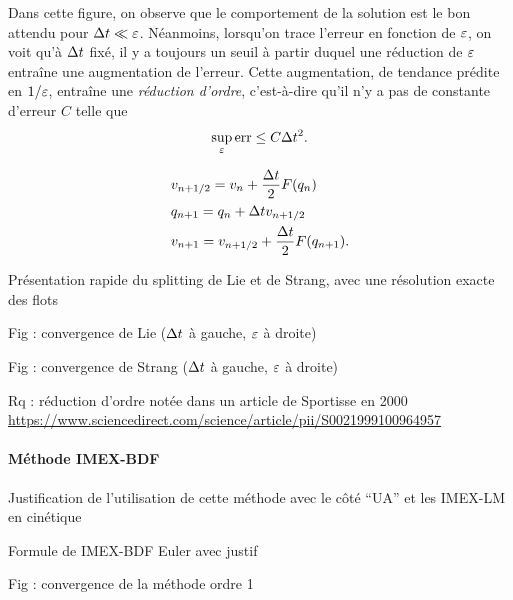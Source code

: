 
Dans cette figure, on observe que le comportement de la solution est le bon attendu pour $\Delta t \ll \varepsilon$. Néanmoins, lorsqu'on trace l'erreur en fonction de $\varepsilon$, on voit qu'à $\Delta t$ fixé, il y a toujours un seuil à partir duquel une réduction de $\varepsilon$ entraîne une augmentation de l'erreur. Cette augmentation, de tendance prédite en $1/\varepsilon$, entraîne une \textit{réduction d'ordre}, c'est-à-dire qu'il n'y a pas de constante d'erreur $C$ telle que 
\begin{equation*}
    \sup_{\varepsilon} \operatorname{err} \leq C \Delta t^2 .
\end{equation*}

\bigskip\bigskip\bigskip
{}
\vspace*{-2\bigskipamount}
\begin{align*}
&   v_{n + 1/2} = v_n + \frac{\Delta t}{2}F(q_n) \\
&   q_{n+1} = q_n + \Delta t v_{n+1/2} \\
&   v_{n+1} = v_{n+1/2} + \frac{\Delta t}{2}F(q_{n+1}) .
\end{align*}
\vspace*{-\medskipamount}

Présentation rapide du splitting de Lie et de Strang, avec une résolution exacte des flots

Fig : convergence de Lie ($\Delta t$ à gauche, $\varepsilon$ à droite)

Fig : convergence de Strang ($\Delta t$ à gauche, $\varepsilon$ à droite)

Rq : réduction d’ordre notée dans un article de Sportisse en 2000 \url{https://www.sciencedirect.com/science/article/pii/S0021999100964957}


\paragraph{Méthode IMEX-BDF}

Justification de l’utilisation de cette méthode avec le côté “UA” et les IMEX-LM en cinétique

Formule de IMEX-BDF Euler avec justif

Fig : convergence de la méthode ordre 1

